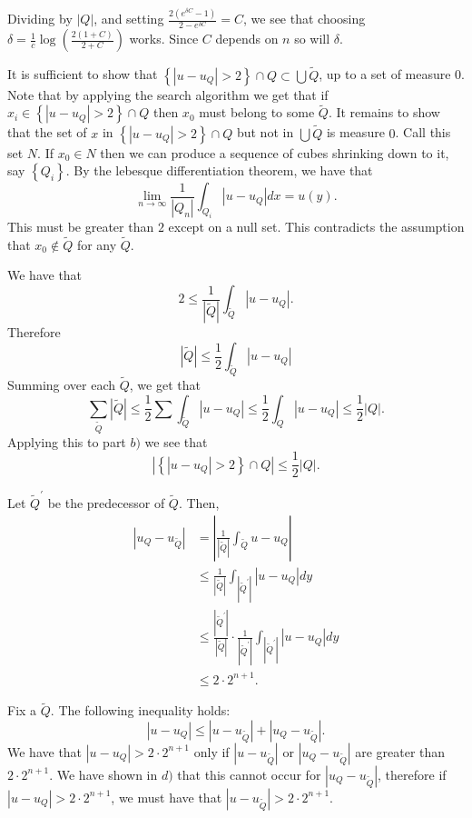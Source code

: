\documentclass[12pt, a4paper]{article}
\theoremstyle{definition}
\begin{document}
Dividing by $|Q|$, and setting $\frac{2(e^{\delta C} - 1)}{2- e^{\delta C}}= C$, we see that choosing $\delta = \frac{1}{c}\log \left( \frac{2(1+C)}{2+C} \right)$ works. Since $C$ depends on $n$ so will $\delta$. 
\item It is sufficient to show that $ \left\{ \left| u-u_Q \right|>2 \right\}\cap Q \subset \bigcup \tilde{Q}$, up to a set of measure 0. Note that by applying the search algorithm we get that if $x_i \in  \left\{ \left| u-u_Q \right|>2 \right\}\cap Q $ then $x_0$ must belong to some $\tilde{Q}$. It remains to show that the set of $x$ in $ \left\{ \left| u-u_Q \right|>2 \right\}\cap Q $ but not in $\bigcup \tilde{Q}$ is measure $0$. 
Call this set $N$. If $x_0 \in N$ then we can produce a sequence of cubes shrinking down to it, say $ \left\{ Q_i \right\}$. By the lebesque differentiation theorem, we have that 
$$ \lim_{n\to \infty} \frac{1}{|Q_n|}\int_{Q_i} |u- u_Q| dx = u(y). $$
This must be greater than $2$ except on a null set. This contradicts the assumption that $x_0\not \in \tilde{Q}$ for any $\tilde{Q}$. 
\item We have that 
$$ 2 \leq \frac{1}{|\tilde{Q}|}\int_{\tilde{Q}} |u-u_Q|. $$ 
Therefore 
$$ |\tilde{Q}| \leq \frac{1}{2}\int_{\tilde{Q}} |u-u_Q| $$ 
Summing over each $\tilde{Q}$, we get that 
$$\sum_{\tilde{Q}} |\tilde{Q}| \leq \frac{1}{2}\sum\int_{\tilde{Q}} |u-u_Q| \leq \frac{1}{2}\int_{Q} |u-u_Q| \leq \frac{1}{2}|Q|.$$
Applying this to part $b)$ we see that 
$$ \left| \left\{ \left| u-u_Q \right|>2 \right\}\cap Q \right|\leq \frac{1}{2}|Q|.$$
\item Let $\tilde{Q}^\prime$ be the predecessor of $\tilde{Q}$. Then,
	\begin{align*}
		|u_Q - u_{\tilde{Q}}| & = \left| \frac{1}{|\tilde{Q}|}\int_{\tilde{Q}} u-u_Q \right|
		\\ & \leq \frac{1}{|\tilde{Q}|} \int_{|\tilde{Q}^\prime|} |u-u_Q|dy
		\\ & \leq \frac{|\tilde{Q}^\prime|}{|\tilde{Q}|}\cdot \frac{1}{|\tilde{Q}^\prime|} \int_{|\tilde{Q}^\prime|} |u-u_Q|dy
		\\ & \leq 2\cdot 2^{n+1}.
	\end{align*}
\item Fix a $\tilde{Q}$. The following inequality holds: 
	$$ |u-u_Q| \leq |u-u_{\tilde{Q}}| + |u_Q - u_{\tilde{Q}}|. $$
	We have that $|u-u_Q|> 2 \cdot 2^{n+1}$ only if $|u-u_{\tilde{Q}}|$ or $|u_Q - u_{\tilde{Q}}|$ are greater than $2 \cdot 2^{n+1}$. 
	We have shown in $d)$ that this cannot occur for $|u_Q - u_{\tilde{Q}}|$, therefore if $ \left| u-u_Q \right|>2\cdot 2^{n+1}$, we must have that $ \left| u-u_{\tilde{Q}} \right|>2 \cdot 2^{n+1}$. 
\end{document}
